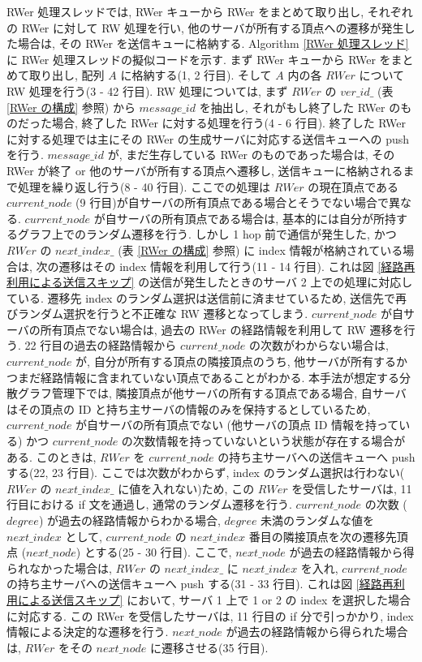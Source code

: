 RWer 処理スレッドでは, RWer キューから RWer をまとめて取り出し, それぞれの RWer に対して RW 処理を行い, 他のサーバが所有する頂点への遷移が発生した場合は, その RWer を送信キューに格納する. Algorithm \ref{RWer 処理スレッド} に RWer 処理スレッドの擬似コードを示す. まず RWer キューから RWer をまとめて取り出し, 配列 $A$ に格納する(1, 2 行目). そして $A$ 内の各 $RWer$ について RW 処理を行う(3 - 42 行目). RW 処理については, まず $RWer$ の $ver\_id\_$ (表 \ref{RWer の構成} 参照) から $message\_id$ を抽出し, それがもし終了した RWer のものだった場合, 終了した RWer に対する処理を行う(4 - 6 行目). 終了した RWer に対する処理では主にその RWer の生成サーバに対応する送信キューへの push を行う. $message\_id$ が, まだ生存している RWer のものであった場合は, その RWer が終了 or 他のサーバが所有する頂点へ遷移し, 送信キューに格納されるまで処理を繰り返し行う(8 - 40 行目). ここでの処理は $RWer$ の現在頂点である $current\_node$ (9 行目)が自サーバの所有頂点である場合とそうでない場合で異なる. $current\_node$ が自サーバの所有頂点である場合は, 基本的には自分が所持するグラフ上でのランダム遷移を行う. しかし 1 hop 前で通信が発生した, かつ $RWer$ の $next\_index\_$ (表 \ref{RWer の構成} 参照) に index 情報が格納されている場合は, 次の遷移はその index 情報を利用して行う(11 - 14 行目). これは図 \ref{経路再利用による送信スキップ} の送信が発生したときのサーバ 2 上での処理に対応している. 遷移先 index のランダム選択は送信前に済ませているため, 送信先で再びランダム選択を行うと不正確な RW 遷移となってしまう. $current\_node$ が自サーバの所有頂点でない場合は, 過去の RWer の経路情報を利用して RW 遷移を行う. 22 行目の過去の経路情報から $current\_node$ の次数がわからない場合は, $current\_node$ が, 自分が所有する頂点の隣接頂点のうち, 他サーバが所有するかつまだ経路情報に含まれていない頂点であることがわかる. 本手法が想定する分散グラフ管理下では, 隣接頂点が他サーバの所有する頂点である場合, 自サーバはその頂点の ID と持ち主サーバの情報のみを保持するとしているため, $current\_node$ が自サーバの所有頂点でない (他サーバの頂点 ID 情報を持っている) かつ $current\_node$ の次数情報を持っていないという状態が存在する場合がある. このときは, $RWer$ を $current\_node$ の持ち主サーバへの送信キューへ push する(22, 23 行目). ここでは次数がわからず, index のランダム選択は行わない($RWer$ の $next\_index\_$ に値を入れない)ため, この $RWer$ を受信したサーバは, 11 行目における if 文を通過し, 通常のランダム遷移を行う. $current\_node$ の次数 ($degree$) が過去の経路情報からわかる場合, $degree$ 未満のランダムな値を $next\_index$ として, $current\_node$ の $next\_index$ 番目の隣接頂点を次の遷移先頂点 ($next\_node$) とする(25 - 30 行目). ここで, $next\_node$ が過去の経路情報から得られなかった場合は, $RWer$ の $next\_index\_$ に $next\_index$ を入れ, $current\_node$ の持ち主サーバへの送信キューへ push する(31 - 33 行目). これは図 \ref{経路再利用による送信スキップ} において, サーバ 1 上で 1 or 2 の index を選択した場合に対応する. この RWer を受信したサーバは, 11 行目の if 分で引っかかり, index 情報による決定的な遷移を行う. $next\_node$ が過去の経路情報から得られた場合は, $RWer$ をその $next\_node$ に遷移させる(35 行目). 

